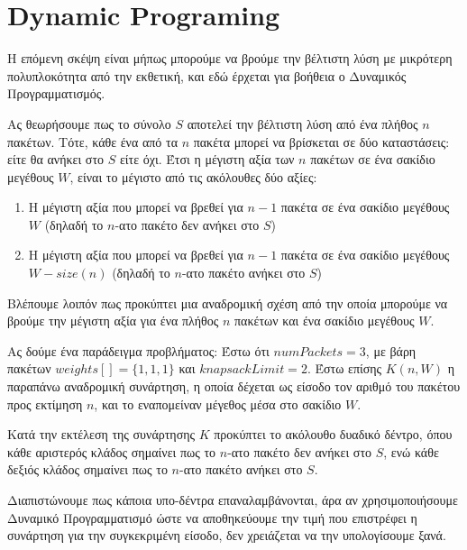 \documentclass{article}
\begin{document}
\section{Dynamic Programing}

Η επόμενη σκέψη είναι μήπως μπορούμε να βρούμε την βέλτιστη λύση με μικρότερη
πολυπλοκότητα από την εκθετική, και εδώ έρχεται για βοήθεια ο Δυναμικός
Προγραμματισμός.

Ας θεωρήσουμε πως το σύνολο $S$ αποτελεί την βέλτιστη λύση από ένα πλήθος $n$
πακέτων. Τότε, κάθε ένα από τα $n$ πακέτα μπορεί να βρίσκεται σε δύο
καταστάσεις: είτε θα ανήκει στο $S$ είτε όχι. Έτσι η μέγιστη αξία των $n$
πακέτων σε ένα σακίδιο μεγέθους $W$, είναι το μέγιστο από τις ακόλουθες δύο
αξίες:

\begin{enumerate}
    \item Η μέγιστη αξία που μπορεί να βρεθεί για $n-1$ πακέτα σε ένα σακίδιο
            μεγέθους $W$ (δηλαδή το $n$-ατο πακέτο δεν ανήκει στο $S$)
    \item Η μέγιστη αξία που μπορεί να βρεθεί για $n-1$ πακέτα σε ένα σακίδιο
            μεγέθους $W-size(n)$ (δηλαδή το $n$-ατο πακέτο ανήκει στο $S$)
\end{enumerate}

Βλέπουμε λοιπόν πως προκύπτει μια αναδρομική σχέση από την οποία μπορούμε να
βρούμε την μέγιστη αξία για ένα πλήθος $n$ πακέτων και ένα σακίδιο μεγέθους $W$.

Ας δούμε ένα παράδειγμα προβλήματος: Έστω ότι $numPackets=3$, με βάρη πακέτων
$weights[]=\{1, 1, 1\}$ και $knapsackLimit=2$. Έστω επίσης $K(n, W)$ η παραπάνω
αναδρομική συνάρτηση, η οποία δέχεται ως είσοδο τον αριθμό του πακέτου προς
εκτίμηση $n$, και το εναπομείναν μέγεθος μέσα στο σακίδιο $W$.

Κατά την εκτέλεση της συνάρτησης $K$ προκύπτει το ακόλουθο δυαδικό δέντρο, όπου
κάθε αριστερός κλάδος σημαίνει πως το $n$-ατο πακέτο δεν ανήκει στο $S$, ενώ
κάθε δεξιός κλάδος σημαίνει πως το $n$-ατο πακέτο ανήκει στο $S$.

\begin{center}
\end{center}

Διαπιστώνουμε πως κάποια υπο-δέντρα επαναλαμβάνονται, άρα αν χρησιμοποιήσουμε
Δυναμικό Προγραμματισμό ώστε να αποθηκεύουμε την τιμή που επιστρέφει η συνάρτηση
για την συγκεκριμένη είσοδο, δεν χρειάζεται να την υπολογίσουμε ξανά.
\end{document}
